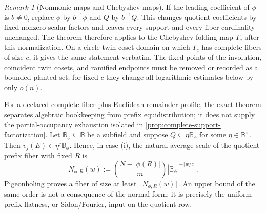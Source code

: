 \documentclass[12pt,a4paper]{amsart}
\numberwithin{equation}{section}
\theoremstyle{remark}
\newtheorem{remark}[remark]{Remark}
\newcommand{\B}{\mathbb B}
\begin{document}
\begin{remark}[Nonmonic maps and Chebyshev maps]
\label{rem:qr-chebyshev}
If the leading coefficient of $\phi$ is $b\ne0$, replace $\phi$ by
$b^{-1}\phi$ and $Q$ by $b^{-1}Q$.  This changes quotient coefficients by
fixed nonzero scalar factors and leaves every support and every fiber
cardinality unchanged.  The theorem therefore applies to the Chebyshev
folding map $T_c$ after this normalization.  On a circle twin-coset domain
on which $T_c$ has complete fibers of size $c$, it gives the same statement
verbatim.  The fixed points of the involution, coincident twin cosets, and
ramified endpoints must be removed or recorded as a bounded planted set;
for fixed $c$ they change all logarithmic estimates below by only $o(n)$.
\end{remark}

For a declared complete-fiber-plus-Euclidean-remainder profile, the exact
theorem separates algebraic bookkeeping from prefix equidistribution; it
does not supply the partial-occupancy exhaustion isolated in
\cref{prop:complete-support-factorization}.  Let
$\B_\phi\subseteq\B$ be a subfield and suppose
\(Q\subseteq\eta\B_\phi\) for some $\eta\in\B^\times$.  Then
\(v_j(E)\in\eta^j\B_\phi\).  Hence, in case
\textup{(i)}, the natural average scale of the quotient-prefix fiber with
fixed $R$ is
\[
 \overline N_{\phi,R}(w)
 :=\binom{N-|\phi(R)|}{m}
       |\B_\phi|^{-\lfloor w/c\rfloor}.             \tag{QR6}\label{eq:qr-natural-scale}
\]
Pigeonholing proves a fiber of size at least
\(\lceil\overline N_{\phi,R}(w)\rceil\).  An upper bound of the same order
is not a consequence of the normal form: it is precisely the uniform
prefix-flatness, or Sidon/Fourier, input on the quotient row.
\end{document}
